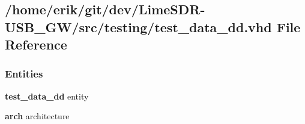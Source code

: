 \subsection{/home/erik/git/dev/\+Lime\+S\+D\+R-\/\+U\+S\+B\+\_\+\+G\+W/src/testing/test\+\_\+data\+\_\+dd.vhd File Reference}
\label{testing_2test__data__dd_8vhd}
\subsubsection*{Entities}
\begin{DoxyCompactItemize}
\item 
{\bf test\+\_\+data\+\_\+dd} entity
\item 
{\bf arch} architecture
\end{DoxyCompactItemize}
